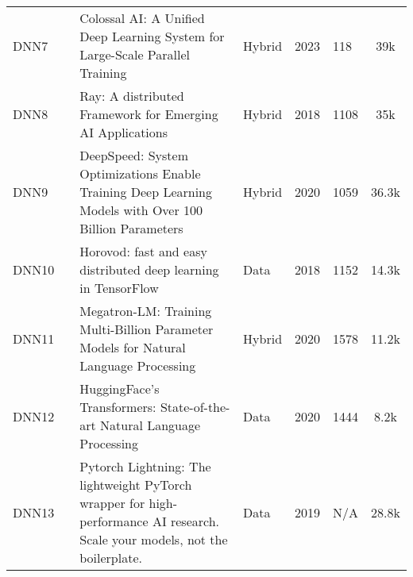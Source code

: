 \begin{table*}[th!]
\begin{tabular}{llp{8.4cm}lllc}
		\small DNN7        & \small \cite{li_colossal-ai_2023}       & \small Colossal AI: A Unified Deep Learning System for Large-Scale Parallel Training                                                & \small Hybrid        & \small 2023          & \small 118                & \small 39k \cite{noauthor_hpcaitechcolossalai_2025}                  \\[1ex]
		\small DNN8        & \small \cite{moritz_ray_2018}           & \small Ray: A distributed Framework for Emerging AI Applications                                                                    & \small Hybrid        & \small 2018          & \small 1108               & \small 35k \cite{noauthor_ray-projectray_2025}                       \\[1ex]
		\small DNN9        & \small \cite{rasley_deepspeed_2020}     & \small DeepSpeed: System Optimizations Enable Training Deep Learning Models with Over 100 Billion Parameters                        & \small Hybrid        & \small 2020          & \small 1059               & \small 36.3k \cite{noauthor_microsoftdeepspeed_2025}                 \\[1ex]
		\small DNN10       & \small \cite{sergeev_horovod_2018}      & \small Horovod: fast and easy distributed deep learning in TensorFlow                                                               & \small Data          & \small 2018          & \small 1152               & \small 14.3k \cite{noauthor_horovodhorovod_2025}                     \\[1ex]
		\small DNN11       & \small \cite{shoeybi_megatron-lm_2020}  & \small Megatron-LM: Training Multi-Billion Parameter Models for Natural Language Processing                                         & \small Hybrid        & \small 2020          & \small 1578               & \small 11.2k \cite{noauthor_nvidiamegatron-lm_2025}                  \\[1ex]
		\small DNN12       & \small \cite{wolf_huggingfaces_2020}    & \small HuggingFace's Transformers: State-of-the-art Natural Language Processing                                                     & \small Data          & \small 2020          & \small 1444               & \small 8.2k \cite{noauthor_huggingfaceaccelerate_2025}               \\[1ex]
		\small DNN13       & \small \cite{noauthor_overview_nodate}  & \small Pytorch Lightning: The lightweight PyTorch wrapper for high-performance AI research. Scale your models, not the boilerplate. & \small Data          & \small 2019          & \small N/A                & \small 28.8k \cite{falcon_pytorch_2019}                              \\[1ex]

\end{tabular}
\end{table*}
